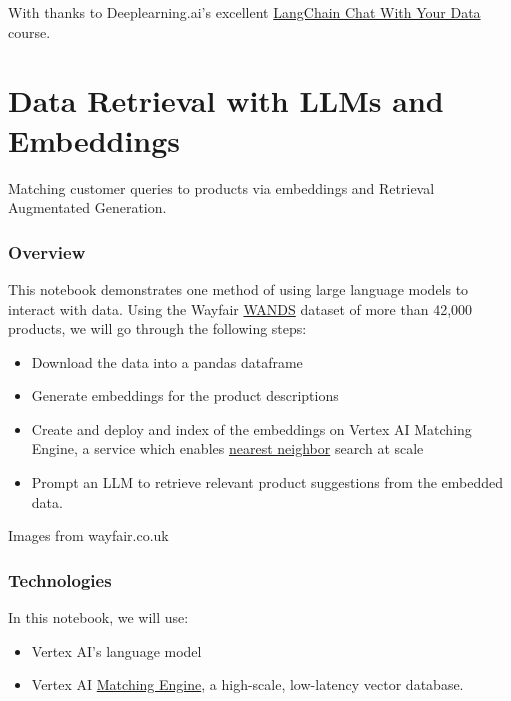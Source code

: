 \documentclass[
  letterpaper,
  DIV=11,
  numbers=noendperiod]{scrreprt}
\begin{document}
With thanks to Deeplearning.ai's excellent
\href{https://learn.deeplearning.ai/langchain-chat-with-your-data/lesson/1/introduction}{LangChain
Chat With Your Data} course.


\hypertarget{data-retrieval-with-llms-and-embeddings}{%
\chapter{Data Retrieval with LLMs and
Embeddings}\label{data-retrieval-with-llms-and-embeddings}}

Matching customer queries to products via embeddings and Retrieval
Augmentated Generation.

\hypertarget{overview}{%
\subsection{Overview}\label{overview}}

This notebook demonstrates one method of using large language models to
interact with data. Using the Wayfair
\href{https://www.aboutwayfair.com/careers/tech-blog/wayfair-releases-wands-the-largest-and-richest-publicly-available-dataset-for-e-commerce-product-search-relevance}{WANDS}
dataset of more than 42,000 products, we will go through the following
steps:

\begin{itemize}
\item
  Download the data into a pandas dataframe
\item
  Generate embeddings for the product descriptions
\item
  Create and deploy and index of the embeddings on Vertex AI Matching
  Engine, a service which enables
  \href{https://en.wikipedia.org/wiki/Nearest_neighbor_search}{nearest
  neighbor} search at scale
\item
  Prompt an LLM to retrieve relevant product suggestions from the
  embedded data.
\end{itemize}

Images from wayfair.co.uk

\hypertarget{technologies}{%
\subsection{Technologies}\label{technologies}}

In this notebook, we will use:

\begin{itemize}
\item
  Vertex AI's language model
\item
  Vertex AI
  \href{https://cloud.google.com/vertex-ai/docs/matching-engine/overview}{Matching
  Engine}, a high-scale, low-latency vector database.
\end{itemize}
\end{document}
